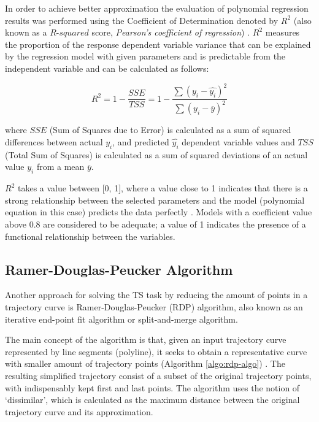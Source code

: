 In order to achieve better approximation the evaluation of polynomial regression results was performed using the Coefficient of Determination denoted by $R^2$ (also known as a $R$-$squared$ score, \textit{Pearson's coefficient of regression}) \cite{inbook:stats}. $R^2$ measures the proportion of the response dependent variable variance that can be explained by the regression model with given parameters and is predictable from the independent variable and can be calculated as follows: 

\begin{equation}\label{eq:r_sq}
R^2 = 1 - \frac{SSE}{TSS} = 1 - \frac{\sum{(y_i - \hat{y_i})^2}}{\sum{(y_i - \overline{y})^2}}
\end{equation}

where $SSE$ (Sum of Squares due to Error) is calculated as a sum of squared differences between actual $y_i$, and predicted $\hat{y_i}$ dependent variable values and $TSS$ (Total Sum of Squares) is calculated as a sum of squared deviations of an actual value $y_i$ from a mean $\overline{y}$.

$R^2$ takes a value between [0, 1], where a value close to 1 indicates that there is a strong relationship between the selected parameters and the model (polynomial equation in this case) predicts the data perfectly \cite{online:reg_r_interpr}. Models with a coefficient value above 0.8 are considered to be adequate; a value of 1 indicates the presence of a functional relationship between the variables.

\subsection{Ramer-Douglas-Peucker Algorithm}

Another approach for solving the TS task by reducing the amount of points in a trajectory curve is Ramer-Douglas-Peucker (RDP) algorithm, also known as an iterative end-point fit algorithm or split-and-merge algorithm.

The main concept of the algorithm is that, given an input trajectory curve represented by line segments (polyline), it seeks to obtain a representative curve with smaller amount of trajectory points (Algorithm \ref{algo:rdp-algo}) \cite{online:rdp_algo_wiki}. The resulting simplified trajectory consist of a subset of the original trajectory points, with indispensably kept first and last points. The algorithm uses the notion of `dissimilar', which is calculated as the maximum distance between the original trajectory curve and its approximation.

